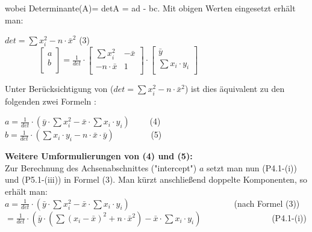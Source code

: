 \documentclass[12pt]{article}
\begin{document}
wobei Determinante(A)= detA = ad - bc. Mit obigen Werten eingesetzt erhält man: \\
\begin{center}
\begin{large}
$ det = \sum{x_i^2} - n \cdot \bar{x}^2 $    (3) \\[0.5cm]        
$ \qquad\qquad  \begin{bmatrix} a \\ b \\ \end{bmatrix} = \frac{1}{det} \cdot { \begin{bmatrix} \sum{x_i^2} & -\bar{x} \\ -n \cdot \bar{x} & 1 \\ \end{bmatrix} \cdot                                                                                                     \begin{bmatrix} \bar{y} \\ \sum{x_i \cdot y_i} \\ \end{bmatrix}} $ \\[0.8cm]
\end{large}
\end{center} 
Unter Berücksichtigung von ($ det = \sum{x_i^2} - n \cdot \bar{x}^2 $) ist dies äquivalent zu den folgenden zwei Formeln : \\
\begin{center}
\begin{Large}
$ a = \frac{1}{det} \cdot (\bar{y} \cdot \sum{x_i^2} - \bar{x} \cdot \sum{x_i \cdot y_i})\qquad $ (4) \\[0.5cm]
$ b = \frac{1}{det} \cdot (\sum {x_i \cdot y_i} - n \cdot \bar{x} \cdot \bar{y})\qquad\qquad $      (5) \\[0.5cm]
\end{Large}
\end{center} 
\textbf{Weitere Umformulierungen von (4) und (5):}\\[0.1cm]
%
Zur Berechnung des Achsenabschnittes ("intercept") $a$ setzt man nun (P4.1-(i)) und (P5.1-(iii)) in Formel (3). Man kürzt anschließend doppelte Komponenten, so erhält  man: \\[0.2cm]
$ a = \frac{1}{det} \cdot (\bar{y} \cdot \sum{x_i^2} - \bar{x} \cdot \sum{x_i \cdot y_i})\qquad \qquad \qquad \qquad \qquad \qquad $      (nach Formel (3))
\\[0.2cm]
$ = \frac{1}{det} \cdot (\bar{y} \cdot (\sum{(x_i - \bar{x})^2} + n \cdot \bar{x}^2) - \bar{x} \cdot \sum{x_i \cdot y_i})\qquad \qquad \qquad \qquad $ (P4.1-(i)) \\[0.2cm]
\end{document}
